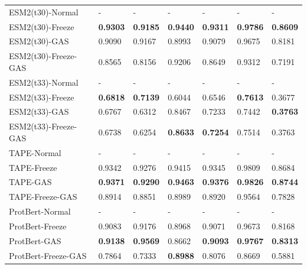 \begin{table}[h]
{\begin{tabular}{lllllll}
		ESM2(t30)-Normal            & -                 & -                  & -               & -                 & -               & -               \\
		ESM2(t30)-Freeze     & \textbf{0.9303}   & \textbf{0.9185}    & \textbf{0.9440} & \textbf{0.9311}   & \textbf{0.9786} & \textbf{0.8609} \\
		ESM2(t30)-GAS        & 0.9090            & 0.9167             & 0.8993          & 0.9079            & 0.9675          & 0.8181          \\
		ESM2(t30)-Freeze-GAS & 0.8565            & 0.8156             & 0.9206          & 0.8649            & 0.9312          & 0.7191          \\ \midrule
		ESM2(t33)-Normal            & -                 & -                  & -               & -                 & -               & -               \\
		ESM2(t33)-Freeze     & \textbf{0.6818}   & \textbf{0.7139}    & 0.6044          & 0.6546            & \textbf{0.7613} & 0.3677          \\
		ESM2(t33)-GAS        & 0.6767            & 0.6312             & 0.8467          & 0.7233            & 0.7442          & \textbf{0.3763} \\
		ESM2(t33)-Freeze-GAS & 0.6738            & 0.6254             & \textbf{0.8633} & \textbf{0.7254}   & 0.7514          & 0.3763          \\ \midrule
		TAPE-Normal                 & -                 & -                  & -               & -                 & -               & -               \\
		TAPE-Freeze          & 0.9342            & 0.9276             & 0.9415          & 0.9345            & 0.9809          & 0.8684          \\
		TAPE-GAS             & \textbf{0.9371}   & \textbf{0.9290}    & \textbf{0.9463} & \textbf{0.9376}   & \textbf{0.9826} & \textbf{0.8744} \\
		TAPE-Freeze-GAS      & 0.8914            & 0.8851             & 0.8989          & 0.8920            & 0.9564          & 0.7828          \\ \midrule
		ProtBert-Normal             & -                 & -                  & -               & -                 & -               & -               \\
		ProtBert-Freeze      & 0.9083            & 0.9176             & 0.8968          & 0.9071            & 0.9673          & 0.8168          \\
		ProtBert-GAS         & \textbf{0.9138}   & \textbf{0.9569}    & 0.8662          & \textbf{0.9093}   & \textbf{0.9767} & \textbf{0.8313} \\
		ProtBert-Freeze-GAS  & 0.7864            & 0.7333             & \textbf{0.8988} & 0.8076            & 0.8669          & 0.5881         \\ 
	\end{tabular}}
\end{table}

